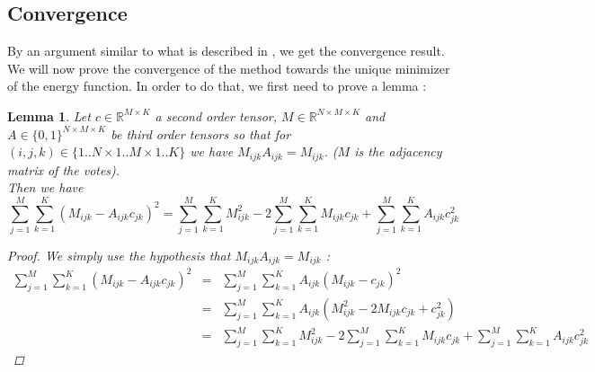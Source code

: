 \documentclass[12pt,a4paper]{article}
\newtheorem{lemma}{Lemma}
\begin{document}
\subsection{Convergence}
By an argument similar to what is described in \cite{Cristo1}, we get the convergence result.
We will now prove the convergence of the method towards the unique minimizer of the energy function. In order to do that, we first need to prove a lemma :
\begin{lemma}
Let $c\in \mathbb{R}^{M \times K}$ a second order tensor, $M\in \mathbb{R}^{N\times M \times K}$ and $A\in \{0,1\}^{N\times M \times K}$ be third order tensors so that for $(i,j,k) \in \{1..N \times 1..M \times 1..K \}$ we have $M_{ijk} A_{ijk} = M_{ijk}$. ($M$ is the adjacency matrix of the votes).\\
Then we have 
$$\sum_{j=1}^M \sum_{k=1}^K (M_{ijk}-A_{ijk} c_{jk})^2 = \sum_{j=1}^M \sum_{k=1}^K M_{ijk}^2 - 2\sum_{j=1}^M \sum_{k=1}^K M_{ijk}c_{jk} + \sum_{j=1}^M \sum_{k=1}^K A_{ijk} c_{jk}^2$$
\begin{proof}
We simply use the hypothesis that $M_{ijk}A_{ijk} = M_{ijk}$ :
\begin{eqnarray*}
\sum_{j=1}^M \sum_{k=1}^K (M_{ijk}-A_{ijk} c_{jk})^2 & = & \sum_{j=1}^M \sum_{k=1}^K A_{ijk}(M_{ijk}-c_{jk})^2 \\
& = & \sum_{j=1}^M \sum_{k=1}^K A_{ijk} (M_{ijk}^2 - 2 M_{ijk}c_{jk} + c_{jk}^2)\\
& = & \sum_{j=1}^M \sum_{k=1}^K M_{ijk}^2 - 2\sum_{j=1}^M \sum_{k=1}^K M_{ijk}c_{jk} + \sum_{j=1}^M \sum_{k=1}^K A_{ijk} c_{jk}^2
\end{eqnarray*}
\end{proof}
\label{lemma:tens}
\end{lemma}
\end{document}
